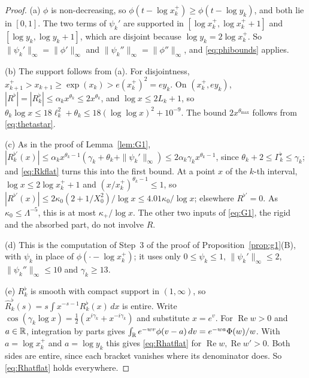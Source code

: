 \begin{proof}
(a) $\phi$ is non-decreasing, so $\phi(t-\log x_k^+)\ge\phi(t-\log y_k)$, and both lie in $[0,1]$. The two terms of $\psi_k'$ are
supported in $[\log x_k^+,\log x_k^++1]$ and $[\log y_k,\log y_k+1]$, which are disjoint because $\log y_k=2\log x_k^+$. So
$\|\psi_k'\|_\infty=\|\phi'\|_\infty$ and $\|\psi_k''\|_\infty=\|\phi''\|_\infty$, and \eqref{eq:phibounds} applies.

(b) The support follows from (a). For disjointness, $x_{k+1}^+>x_{k+1}\ge\exp(x_k)>e(x_k^+)^2=ey_k$. On $(x_k^+,ey_k)$,
$|R^\flat|=|R_k^\flat|\le\alpha_kx^{\theta_k}\le2x^{\theta_k}$, and $\log x\le2L_k+1$, so $\theta_k\log x\le18\ell_k^2+\theta_k\le18(\log\log x)^2+10^{-9}$.
The bound $2x^{\theta_{\max}}$ follows from \eqref{eq:thetastar}.

(c) As in the proof of Lemma~\ref{lem:G1}, $|R_k^{\flat\prime}(x)|\le\alpha_kx^{\theta_k-1}(\gamma_k+\theta_k+\|\psi_k'\|_\infty)\le
2\alpha_k\gamma_kx^{\theta_k-1}$, since $\theta_k+2\le\Gamma_k^\flat\le\gamma_k$; and \eqref{eq:Rkflat} turns this into the first bound. At a
point $x$ of the $k$-th interval, $\log x\le2\log x_k^++1$ and $(x/x_k^+)^{\theta_k-1}\le1$, so
$|R^{\flat\prime}(x)|\le2\kappa_0(2+1/X_0^2)/\log x\le4.01\kappa_0/\log x$; elsewhere $R^{\flat\prime}=0$. As $\kappa_0\le\Lambda^{-5}$, this is at
most $\kappa_+/\log x$. The other two inputs of \eqref{eq:G1}, the rigid and the absorbed part, do not involve $R$.

(d) This is the computation of Step~3 of the proof of Proposition~\ref{prop:g1}(B), with $\psi_k$ in place of
$\phi(\cdot-\log x_k^+)$; it uses only $0\le\psi_k\le1$, $\|\psi_k'\|_\infty\le2$, $\|\psi_k''\|_\infty\le10$ and $\gamma_k\ge13$.

(e) $R_k^\flat$ is smooth with compact support in $(1,\infty)$, so $\widehat R_k^\flat(s)=s\int x^{-s-1}R_k^\flat(x)\,dx$ is entire. Write
$\cos(\gamma_k\log x)=\frac12(x^{i\gamma_k}+x^{-i\gamma_k})$ and substitute $x=e^v$. For $\operatorname{Re}w>0$ and $a\in\mathbb{R}$, integration by
parts gives $\int_{\mathbb{R}} e^{-wv}\phi(v-a)\,dv=e^{-wa}\Phi(w)/w$. With $a=\log x_k^+$ and $a=\log y_k$ this gives \eqref{eq:Rhatflat} for
$\operatorname{Re}w,\operatorname{Re}w'>0$. Both sides are entire, since each bracket vanishes where its denominator does. So
\eqref{eq:Rhatflat} holds everywhere.
\end{proof}

